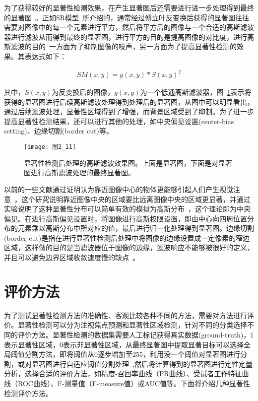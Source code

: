 为了获得较好的显著性检测效果，在产生显著图后还需要进行进一步处理得到最终的显著图~\cite{BorjiTIP2013Quantitative}。正如SR模型~\cite{HouXiaodiCVPR2007Residual}所介绍的，通常经过傅立叶反变换后获得的显著图往往需要对图像中的每一个元素进行平方，然后将平方后的图像与一个合适的高斯滤波器进行滤波从而得到最终的显著图，进行平方的目的是提高图像的对比度，进行高斯滤波的目的~\cite{ZhangLiming2010Book}一方面为了抑制图像的噪声，另一方面为了提高显著性检测的效果。其表达式如下：
\begin{linenomath}
\begin{align}
SM(x,y)=g(x,y)\ast S(x,y)^{2}
\label{式2_37}
\end{align}
\end{linenomath}
其中，$S(x,y)$为反变换后的图像，$g(x,y)$为一个低通高斯滤波器，图~\ref{图2_11}表示将获得的显著图进行后续高斯滤波处理得到处理后的显著图，从图中可以明显看出，通过后续滤波处理，显著性区域得到了增强，而背景区域受到了抑制。为了进一步提高显著性检测结果，还可以进行其他的处理，如中央偏见设置(center-bias setting)、边缘切割(border cut)等。
\begin{figure}[h] %
  \centering
  \texttt{[image: 图2\_11]}
  \caption{显著性检测后处理的高斯滤波效果图。上面是显著图，下面是对显著图进行高斯滤波处理的最终显著图。}
  \label{图2_11}
\end{figure}

以前的一些文献通过证明认为靠近图像中心的物体更能够引起人们产生视觉注意~\cite{JuddICCV2009Learning}，这个研究说明靠近图像中央的区域要比远离图像中央的区域更显著，并通过实验说明了这种显著性分布可以简单有效的模拟为高斯分布~\cite{ZhangLin2013SDSP}，这个理论即为中央偏见。在进行高斯偏见设置时，将图像进行高斯权限设置，即由中心向四周位置分布的元素乘以高斯分布中所对应的值，最后进行归一化处理得到显著图。边缘切割(border cut)是指在进行显著性检测后处理中将图像的边缘设置成一定像素的窄边区域，这样做的目的是当滤波器位于图像的边缘，滤波响应不能够被很好的定义，并且可以避免边界区域收敛速度慢的缺点~\cite{ChengMingMingCVPR2011Global}。

\section{评价方法}
\label{2_5}

为了测试显著性检测方法的准确性、客观比较各种不同的方法，需要对方法进行评价。显著性检测可以分为注视焦点预测和显著性区域检测\cite{LiYinCVPR2014Secrets}，针对不同的分类选择不同的评价方法。显著性检测的数据集需要人工标记获得真实数据(ground-truth)，$1$表示显著性区域，$0$表示非显著性区域，从最终显著图中提取显著目标可以选择全局阈值分割方法，即将阈值从0逐步增加至255，利用没一个阈值对显著图进行分割，或对显著图进行自适应阈值分割处理~\cite{AchantaCVPR2009Frequency},然后将计算得到的显著图进行定性定量分析，选择合适的评价方法，如精度-召回率曲线（PR曲线）、受试者工作特征曲线（ROC曲线）、F-测量值（F-measure值）或AUC值等。下面将介绍几种显著性检测评价方法。

